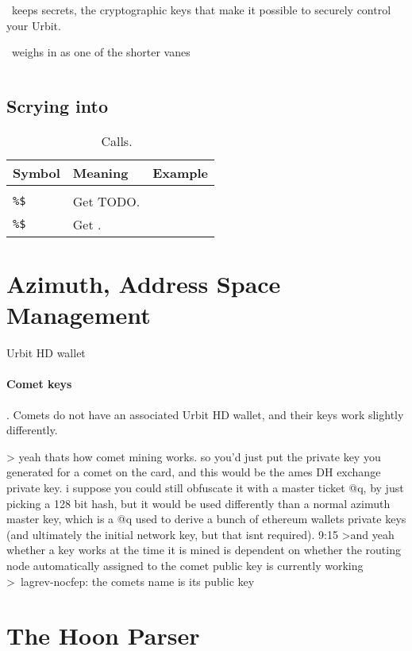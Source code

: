 \jael~keeps secrets, the cryptographic keys that make it possible to securely control your Urbit.

\jael~weighs in as one of the shorter vanes

\begin{lstlisting}

\end{lstlisting}


\subsection{Scrying into \jael}





\begin{table}[h!]
  \begin{center}
    \caption{\jael~\dotket~Calls.}
    \label{ha:jael}
    \begin{tabular}{lll}
      Symbol & Meaning & Example \\
      \hline \\
      \texttt{\%\$} & Get TODO. & \\
      \texttt{\%\$} & Get . & \\
    \end{tabular}
  \end{center}
\end{table}




\section[Azimuth]{Azimuth, Address Space Management}

Urbit HD wallet


\paragraph{Comet keys}.  Comets do not have an associated Urbit HD wallet, and their keys work slightly differently.

> yeah thats how comet mining works. so you'd just put the private key you generated for a comet on the card, and this would be the ames DH exchange private key. i suppose you could still obfuscate it with a master ticket @q, by just picking a 128 bit hash, but it would be used differently than a normal azimuth master key, which is a @q used to derive a bunch of ethereum wallets private keys (and ultimately the initial network key, but that isnt required).
9:15
>and yeah whether a key works at the time it is mined is dependent on whether the routing node automatically assigned to the comet public key is currently working
>~lagrev-nocfep: the comets name is its public key


\section[Hoon Parser]{The Hoon Parser}
